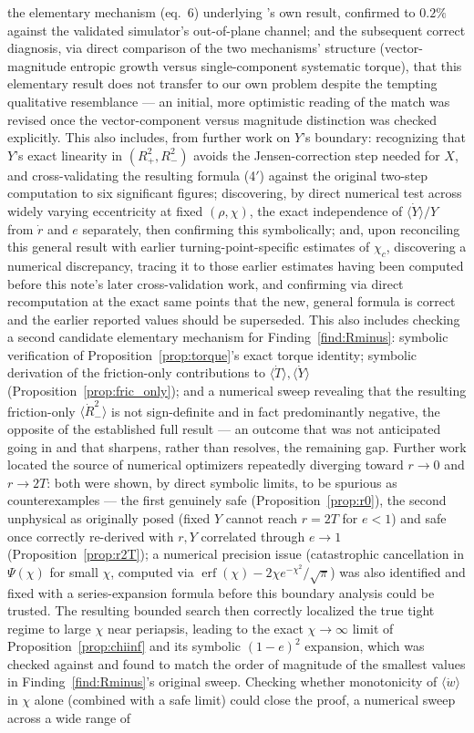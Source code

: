 \documentclass[12pt]{amsart}
\theoremstyle{plain}
\theoremstyle{remark}
\begin{document}
the elementary mechanism (eq.~6) underlying \cite{HamiltonModak2024}'s own result, confirmed to $0.2\%$ against the validated simulator's out-of-plane channel; and the subsequent correct diagnosis, via direct comparison of the two mechanisms' structure (vector-magnitude entropic growth versus single-component systematic torque), that this elementary result does not transfer to our own problem despite the tempting qualitative resemblance --- an initial, more optimistic reading of the match was revised once the vector-component versus magnitude distinction was checked explicitly. This also includes, from further work on $Y$'s boundary: recognizing that $Y$'s exact linearity in $(R_+^2,R_-^2)$ avoids the Jensen-correction step needed for $X$, and cross-validating the resulting formula (4$'$) against the original two-step computation to six significant figures; discovering, by direct numerical test across widely varying eccentricity at fixed $(\rho,\chi)$, the exact independence of $\langle\dot Y\rangle/Y$ from $\dot r$ and $e$ separately, then confirming this symbolically; and, upon reconciling this general result with earlier turning-point-specific estimates of $\chi_c$, discovering a numerical discrepancy, tracing it to those earlier estimates having been computed before this note's later cross-validation work, and confirming via direct recomputation at the exact same points that the new, general formula is correct and the earlier reported values should be superseded. This also includes checking a second candidate elementary mechanism for Finding~\ref{find:Rminus}: symbolic verification of Proposition~\ref{prop:torque}'s exact torque identity; symbolic derivation of the friction-only contributions to $\langle\dot T\rangle,\langle\dot Y\rangle$ (Proposition~\ref{prop:fric_only}); and a numerical sweep revealing that the resulting friction-only $\langle\dot R_-^2\rangle$ is not sign-definite and in fact predominantly negative, the opposite of the established full result --- an outcome that was not anticipated going in and that sharpens, rather than resolves, the remaining gap. Further work located the source of numerical optimizers repeatedly diverging toward $r\to0$ and $r\to2T$: both were shown, by direct symbolic limits, to be spurious as counterexamples --- the first genuinely safe (Proposition~\ref{prop:r0}), the second unphysical as originally posed (fixed $Y$ cannot reach $r=2T$ for $e<1$) and safe once correctly re-derived with $r,Y$ correlated through $e\to1$ (Proposition~\ref{prop:r2T}); a numerical precision issue (catastrophic cancellation in $\Psi(\chi)$ for small $\chi$, computed via $\operatorname{erf}(\chi)-2\chi e^{-\chi^2}/\sqrt\pi$) was also identified and fixed with a series-expansion formula before this boundary analysis could be trusted. The resulting bounded search then correctly localized the true tight regime to large $\chi$ near periapsis, leading to the exact $\chi\to\infty$ limit of Proposition~\ref{prop:chiinf} and its symbolic $(1-e)^2$ expansion, which was checked against and found to match the order of magnitude of the smallest values in Finding~\ref{find:Rminus}'s original sweep. Checking whether monotonicity of $\langle\dot w\rangle$ in $\chi$ alone (combined with a safe limit) could close the proof, a numerical sweep across a wide range of 
\end{document}
